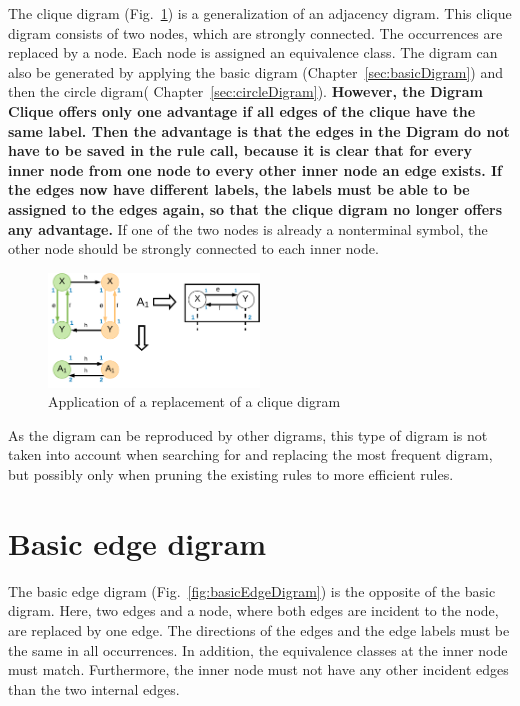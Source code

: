 \documentclass[a4paper]{scrartcl}
\newcommand{\asd}[1]{\textbf{#1}}
\begin{document}
The clique digram (Fig.~\ref{fig:cliqueDigram}) is a generalization of an adjacency digram.
This clique digram consists of two nodes, which are strongly connected. The occurrences are replaced by a node. Each node is assigned an equivalence class. The digram can also be generated by applying the basic digram (Chapter~\ref{sec:basicDigram}) and then the circle digram( Chapter~\ref{sec:circleDigram}). \asd{However, the Digram Clique offers only one advantage if all edges of the clique have the same label. Then the advantage is that the edges in the Digram do not have to be saved in the rule call, because it is clear that for every inner node from one node to every other inner node an edge exists. If the edges now have different labels, the labels must be able to be assigned to the edges again, so that the clique digram no longer offers any advantage.} If one of the two nodes is already a nonterminal symbol, the other node should be strongly connected to each inner node. 

\begin{figure}[h]
	\centering
	\includegraphics[width=0.5\textwidth]{img/cliqueDigram}
	\caption{Application of a replacement of a clique digram}
	\label{fig:cliqueDigram}
\end{figure}
As the digram can be reproduced by other digrams, this type of digram is not taken into account when searching for and replacing the most frequent digram, but possibly only when pruning the existing rules to more efficient rules.



\section{Basic edge digram}
\label{sec:basicEdgeDigram}


The basic edge digram (Fig.~\ref{fig:basicEdgeDigram}) is the opposite of the basic digram.
Here, two edges and a node, where both edges are incident to the node, are replaced by one edge. The directions of the edges and the edge labels must be the same in all occurrences. In addition, the equivalence classes at the inner node must match. Furthermore, the inner node must not have any other incident edges than the two internal edges. 
\end{document}
